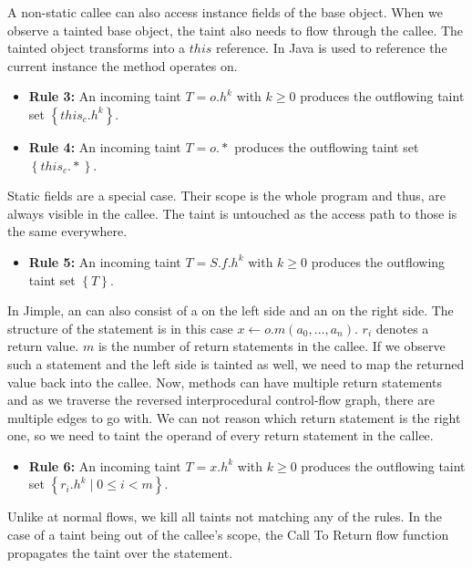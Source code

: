 \documentclass[../draft.tex]{subfiles}
\begin{document}
    A non-static callee can also access instance fields of the base object. When we observe a tainted base object, the taint also needs to flow through the callee. The tainted object transforms into a $\mathit{this}$ reference. In Java  is used to  reference the current instance the method operates on.
    \begin{itemize}
        \item[] \textbf{Rule 3:} An incoming taint $T=o.h^k$ with $k \geq 0$ produces the outflowing taint set $\left\{\mathit{this}_c.h^k\right\}$. 
        \item[] \textbf{Rule 4:} An incoming taint $T=o.*$ produces the outflowing taint set $\left\{\mathit{this}_c.*\right\}$.
    \end{itemize}
    
    Static fields are a special case. Their scope is the whole program and thus, are always visible in the callee. The taint is untouched as the access path to those is the same everywhere.
    \begin{itemize}
        \item[] \textbf{Rule 5:} An incoming taint $T = S.f.h^k$ with $k \geq 0$ produces the outflowing taint set $\left\{T\right\}$.
    \end{itemize}

    In Jimple, an  can also consist of a  on the left side and an  on the right side. The structure of the statement is in this case $x \leftarrow o.m(a_0,...,a_n)$. $r_i$ denotes a return value. $m$ is the number of return statements in the callee. If we observe such a statement and the left side is tainted as well, we need to map the returned value back into the callee. Now, methods can have multiple return statements and as we traverse the reversed interprocedural control-flow graph, there are multiple edges to go with. We can not reason which return statement is the right one, so we need to taint the operand of every return statement in the callee.
    \begin{itemize}
        \item[] \textbf{Rule 6:} An incoming taint $T = x.h^k$ with $k \geq 0$ produces the outflowing taint set $\left\{r_i.h^k \mid 0 \leq i < m \right\}$. 
    \end{itemize}

    Unlike at normal flows, we kill all taints not matching any of the rules. In the case of a taint being out of the callee's scope, the Call To Return flow function propagates the taint over the statement.
\end{document}
